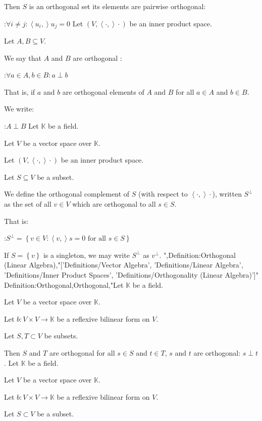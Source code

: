 Then $S$ is an orthogonal set  its elements are pairwise orthogonal:

:$\forall i \ne j: \left\langle u_i,   \right\rangle{u_j} = 0$
Let $\left( V, \left\langle \cdot,   \right\rangle\cdot \right)$ be an inner product space.

Let $A, B \subseteq V$.

We say that $A$ and $B$ are orthogonal :

:$\forall a \in A, b \in B: a \perp b$

That is, if $a$ and $b$ are orthogonal elements of $A$ and $B$ for all $a \in A$ and $b \in B$.


We write: 

:$A \perp B$
Let $\mathbb K$ be a field.

Let $V$ be a vector space over $\mathbb K$.

Let $\left( V, \left\langle \cdot,   \right\rangle\cdot \right)$ be an inner product space.

Let $S\subseteq V$ be a subset.


We define the orthogonal complement of $S$ (with respect to $\left\langle \cdot,   \right\rangle\cdot$), written $S^\perp$ as the set of all $v \in V$ which are orthogonal to all $s \in S$.

That is: 

:$S^\perp = \left\lbrace v \in V : \left\langle v,   \right\rangle s = 0 \text { for all } s \in S \right\rbrace$


If $S = \left\lbrace v \right\rbrace$ is a singleton, we may write $S^\perp$ as $v^\perp$.
",Definition:Orthogonal (Linear Algebra),"['Definitions/Vector Algebra', 'Definitions/Linear Algebra', 'Definitions/Inner Product Spaces', 'Definitions/Orthogonality (Linear Algebra)']"
Definition:Orthogonal,Orthogonal,"Let $\mathbb K$ be a field.

Let $V$ be a vector space over $\mathbb K$.

Let $b: V \times V \to \mathbb K$ be a reflexive bilinear form on $V$.

Let $S, T \subset V$ be subsets.


Then $S$ and $T$ are orthogonal  for all $s \in S$ and $t \in T$, $s$ and $t$ are orthogonal: $s \perp t$.
Let $\mathbb K$ be a field.

Let $V$ be a vector space over $\mathbb K$.

Let $b : V\times V \to \mathbb K$ be a reflexive bilinear form on $V$.

Let $S\subset V$ be a subset.


